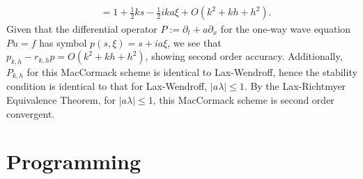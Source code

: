 \documentclass{article}
\providecommand{\abs}[1]{\left\lvert#1\right\rvert}
\begin{document}
\begin{itemize}
\begin{align*}
               & = 1 + \frac{1}{2} k s - \frac{1}{2} i k a \xi + O \left( k^2 + kh + h^2 \right).
\end{align*}
Given that the differential operator $P := \partial_t + a \partial_x$ for the one-way wave equation $P u = f$ has symbol $p(s,\xi) = s + i a \xi$, we see that $p_{k,h} - r_{k,h} p = O \left( k^2 + kh + h^2 \right)$, showing second order accuracy. Additionally, $P_{k,h}$ for this MacCormack scheme is identical to Lax-Wendroff, hence the stability condition is identical to that for Lax-Wendroff, $\abs{a\lambda} \leq 1$. By the Lax-Richtmyer Equivalence Theorem, for $\abs{a\lambda} \leq 1$, this MacCormack scheme is second order convergent.

\end{itemize}

\section{Programming}
\end{document}
